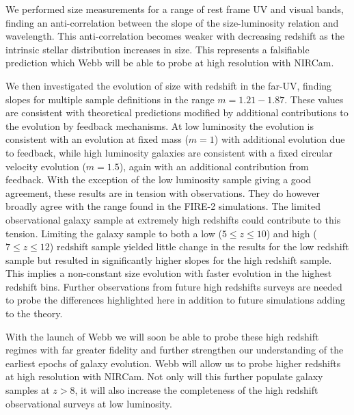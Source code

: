 We performed size measurements for a range of rest frame UV and visual bands, finding an anti-correlation between the slope of the size-luminosity relation and wavelength. This anti-correlation becomes weaker with decreasing redshift as the intrinsic stellar distribution increases in size. This represents a falsifiable prediction which Webb will be able to probe at high resolution with NIRCam.

We then investigated the evolution of size with redshift in the far-UV, finding slopes for multiple sample definitions in the range $m=1.21-1.87$. These values are consistent with theoretical predictions modified by additional contributions to the evolution by feedback mechanisms. At low luminosity the evolution is consistent with an evolution at fixed mass ($m=1$) with additional evolution due to feedback, while high luminosity galaxies are consistent with a fixed circular velocity evolution ($m=1.5$), again with an additional contribution from feedback. 
With the exception of the low luminosity sample giving a good agreement, these results are in tension with observations. They do however broadly agree with the range found in the FIRE-2 simulations. The limited observational galaxy sample at extremely high redshifts could contribute to this tension. 
Limiting the galaxy sample to both a low ($5 \leq z \leq 10$) and high ($7 \leq z \leq 12$) redshift sample yielded little change in the results for the low redshift sample but resulted in significantly higher slopes for the high redshift sample. This implies a non-constant size evolution with faster evolution in the highest redshift bins. Further observations from future high redshifts surveys are needed to probe the differences highlighted here in addition to future simulations adding to the theory. 


With the launch of Webb we will soon be able to probe these high redshift regimes with far greater fidelity and further strengthen our understanding of the earliest epochs of galaxy evolution. Webb will allow us to probe higher redshifts at high resolution with NIRCam. Not only will this further populate galaxy samples at $z>8$, it will also increase the completeness of the high redshift observational surveys at low luminosity.


